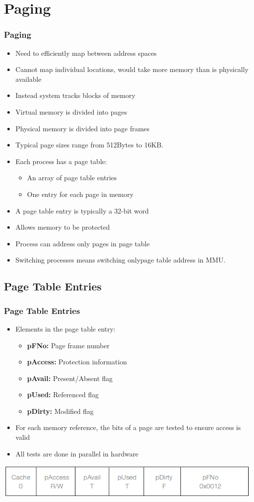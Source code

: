 \documentclass{beamer}
\begin{document}
\section{Paging}
\begin{frame}
\frametitle{Paging}
\begin{itemize}
\item Need to efficiently map between address spaces
\item Cannot map individual locations, would take more memory than is physically available
\item Instead system tracks blocks of memory
\item Virtual memory is divided into pages
\item Physical memory is divided into page frames
\item Typical page sizes range from 512Bytes to 16KB.
\item Each process has a page table:
\begin{itemize}
\item An array of page table entries
\item One entry for each page in memory
\end{itemize}
\item A page table entry is typically a 32-bit word
\item Allows memory to be protected
\item Process can address only pages in page table
\item Switching processes means switching onlypage table address in MMU.
\end{itemize}
\end{frame}
\subsection{Page Table Entries}
\begin{frame}
\frametitle{Page Table Entries}
\begin{itemize}
\item Elements in the page table entry:
\begin{itemize}
\item \textbf{pFNo:} Page frame number
\item \textbf{pAccess:} Protection information
\item \textbf{pAvail:} Present/Absent flag
\item \textbf{pUsed:} Referenced flag
\item \textbf{pDirty:} Modified flag
\end{itemize}
\item For each memory reference, the bits of a page are tested to ensure access is valid
\item All tests are done in parallel in hardware
\end{itemize}
\includegraphics[scale=.35]{pEntry.png}
\end{frame}
\end{document}
